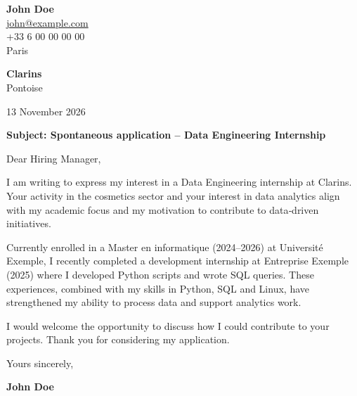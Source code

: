 \documentclass[11pt,a4paper]{article}
\begin{document}
{\Large\bfseries John Doe}\\[0.3cm]


\href{mailto:john@example.com}{john@example.com}\\



+33 6 00 00 00 00\\



Paris\\


\vspace{1cm}

\begin{flushright}

\textbf{Clarins}\\



Pontoise\\


\vspace{0.5cm}

13 November 2026

\end{flushright}

\vspace{0.8cm}

\textbf{Subject: Spontaneous application – Data Engineering Internship}

\vspace{0.6cm}


Dear Hiring Manager,


\vspace{0.5cm}

\justifying


I am writing to express my interest in a Data Engineering internship at Clarins. Your activity in the cosmetics sector and your interest in data analytics align with my academic focus and my motivation to contribute to data‑driven initiatives.

\par

Currently enrolled in a Master en informatique (2024–2026) at Université Exemple, I recently completed a development internship at Entreprise Exemple (2025) where I developed Python scripts and wrote SQL queries. These experiences, combined with my skills in Python, SQL and Linux, have strengthened my ability to process data and support analytics work.

\par

I would welcome the opportunity to discuss how I could contribute to your projects. Thank you for considering my application.

\par


\vspace{0.7cm}


Yours sincerely,


\vspace{0.5cm}

\textbf{John Doe}
\end{document}
